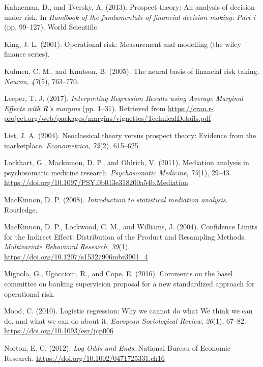 \documentclass[]{DissertateUSU}
\begin{document}
\hypertarget{ref-kahneman2013prospect}{}
Kahneman, D., and Tversky, A. (2013). Prospect theory: An analysis of
decision under risk. In \emph{Handbook of the fundamentals of financial
decision making: Part i} (pp. 99--127). World Scientific.

\hypertarget{ref-king2001operational}{}
King, J. L. (2001). Operational risk: Measurement and modelling (the
wiley finance series).

\hypertarget{ref-kuhnen2005neural}{}
Kuhnen, C. M., and Knutson, B. (2005). The neural basis of financial
risk taking. \emph{Neuron}, \emph{47}(5), 763--770.

\hypertarget{ref-Leeper2017}{}
Leeper, T. J. (2017). \emph{Interpreting Regression Results using
Average Marginal Effects with R's margins} (pp. 1--31). Retrieved from
\url{https://cran.r-project.org/web/packages/margins/vignettes/TechnicalDetails.pdf}

\hypertarget{ref-list2004neoclassical}{}
List, J. A. (2004). Neoclassical theory versus prospect theory: Evidence
from the marketplace. \emph{Econometrica}, \emph{72}(2), 615--625.

\hypertarget{ref-Lockhart2011}{}
Lockhart, G., Mackinnon, D. P., and Ohlrich, V. (2011). Mediation
analysis in psychosomatic medicine research. \emph{Psychosomatic
Medicine}, \emph{73}(1), 29--43.
\url{https://doi.org/10.1097/PSY.0b013e318200a54b.Mediation}

\hypertarget{ref-mackinnon2008intro}{}
MacKinnon, D. P. (2008). \emph{Introduction to statistical mediation
analysis}. Routledge.

\hypertarget{ref-MacKinnon2004}{}
MacKinnon, D. P., Lockwood, C. M., and Williams, J. (2004). Confidence
Limits for the Indirect Effect: Distribution of the Product and
Resampling Methods. \emph{Multivariate Behavioral Research},
\emph{39}(1). \url{https://doi.org/10.1207/s15327906mbr3901_4}

\hypertarget{ref-mignola2016comments}{}
Mignola, G., Ugoccioni, R., and Cope, E. (2016). Comments on the basel
committee on banking supervision proposal for a new standardized
approach for operational risk.

\hypertarget{ref-Mood2010}{}
Mood, C. (2010). Logistic regression: Why we cannot do what We think we
can do, and what we can do about it. \emph{European Sociological
Review}, \emph{26}(1), 67--82. \url{https://doi.org/10.1093/esr/jcp006}

\hypertarget{ref-Norton2012}{}
Norton, E. C. (2012). \emph{Log Odds and Ends}. National Bureau of
Economic Research. \url{https://doi.org/10.1002/0471725331.ch16}
\end{document}
